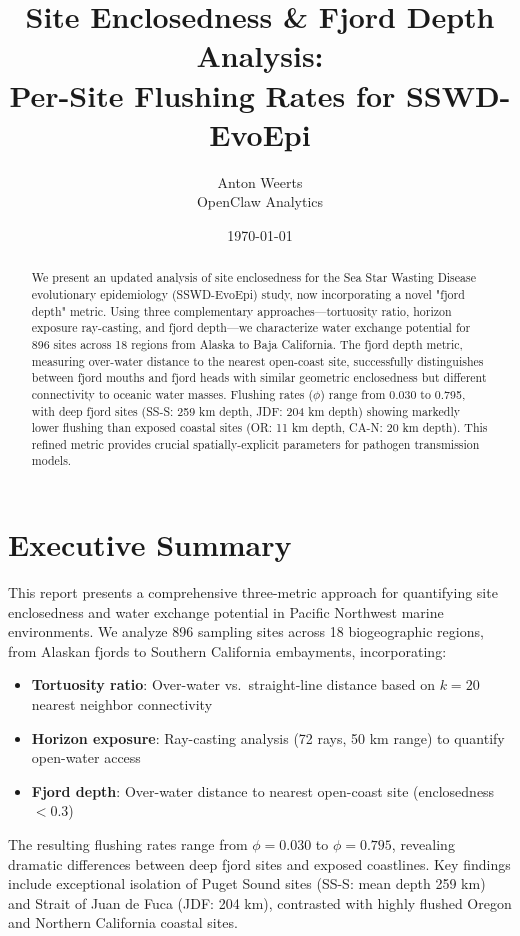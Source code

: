 \documentclass[11pt,a4paper]{article}
\title{\Large \textbf{Site Enclosedness \& Fjord Depth Analysis: \\Per-Site Flushing Rates for SSWD-EvoEpi}}
\author{Anton Weerts \\
        OpenClaw Analytics}
\date{\today}
\begin{document}
\maketitle

\begin{abstract}
We present an updated analysis of site enclosedness for the Sea Star Wasting Disease evolutionary epidemiology (SSWD-EvoEpi) study, now incorporating a novel "fjord depth" metric. Using three complementary approaches—tortuosity ratio, horizon exposure ray-casting, and fjord depth—we characterize water exchange potential for 896 sites across 18 regions from Alaska to Baja California. The fjord depth metric, measuring over-water distance to the nearest open-coast site, successfully distinguishes between fjord mouths and fjord heads with similar geometric enclosedness but different connectivity to oceanic water masses. Flushing rates ($\phi$) range from 0.030 to 0.795, with deep fjord sites (SS-S: 259 km depth, JDF: 204 km depth) showing markedly lower flushing than exposed coastal sites (OR: 11 km depth, CA-N: 20 km depth). This refined metric provides crucial spatially-explicit parameters for pathogen transmission models.
\end{abstract}

\tableofcontents
\newpage

\section{Executive Summary}

This report presents a comprehensive three-metric approach for quantifying site enclosedness and water exchange potential in Pacific Northwest marine environments. We analyze 896 sampling sites across 18 biogeographic regions, from Alaskan fjords to Southern California embayments, incorporating:

\begin{itemize}
    \item \textbf{Tortuosity ratio}: Over-water vs.\ straight-line distance based on $k=20$ nearest neighbor connectivity
    \item \textbf{Horizon exposure}: Ray-casting analysis (72 rays, 50 km range) to quantify open-water access
    \item \textbf{Fjord depth}: Over-water distance to nearest open-coast site (enclosedness $< 0.3$)
\end{itemize}

The resulting flushing rates range from $\phi = 0.030$ to $\phi = 0.795$, revealing dramatic differences between deep fjord sites and exposed coastlines. Key findings include exceptional isolation of Puget Sound sites (SS-S: mean depth 259 km) and Strait of Juan de Fuca (JDF: 204 km), contrasted with highly flushed Oregon and Northern California coastal sites.
\end{document}
